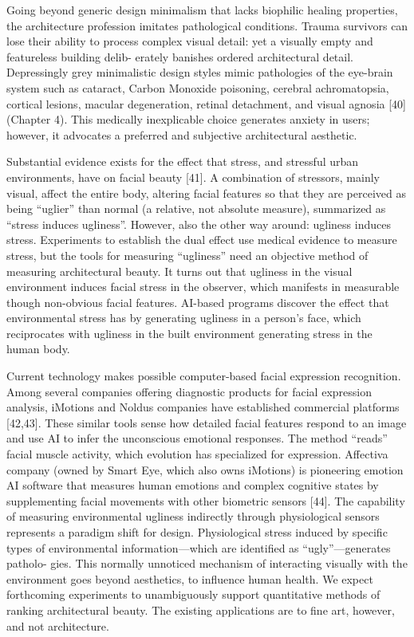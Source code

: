 \documentclass[a4paper]{article}
\begin{document}
Going beyond generic design minimalism that lacks biophilic healing properties, the
architecture profession imitates pathological conditions. Trauma survivors can lose their
ability to process complex visual detail: yet a visually empty and featureless building delib-
erately banishes ordered architectural detail. Depressingly grey minimalistic design styles
mimic pathologies of the eye-brain system such as cataract, Carbon Monoxide poisoning,
cerebral achromatopsia, cortical lesions, macular degeneration, retinal detachment, and
visual agnosia [40] (Chapter 4). This medically inexplicable choice generates anxiety in
users; however, it advocates a preferred and subjective architectural aesthetic.

Substantial evidence exists for the effect that stress, and stressful urban environments,
have on facial beauty [41]. A combination of stressors, mainly visual, affect the entire
body, altering facial features so that they are perceived as being “uglier” than normal (a
relative, not absolute measure), summarized as “stress induces ugliness”. However, also
the other way around: ugliness induces stress. Experiments to establish the dual effect
use medical evidence to measure stress, but the tools for measuring “ugliness” need an
objective method of measuring architectural beauty.
It turns out that ugliness in the visual environment induces facial stress in the observer,
which manifests in measurable though non-obvious facial features. AI-based programs discover the effect that environmental stress has by generating ugliness in a person’s
face, which reciprocates with ugliness in the built environment generating stress in the
human body.

Current technology makes possible computer-based facial expression recognition.
Among several companies offering diagnostic products for facial expression analysis,
iMotions and Noldus companies have established commercial platforms [42,43]. These
similar tools sense how detailed facial features respond to an image and use AI to infer
the unconscious emotional responses. The method “reads” facial muscle activity, which
evolution has specialized for expression. Affectiva company (owned by Smart Eye, which
also owns iMotions) is pioneering emotion AI software that measures human emotions
and complex cognitive states by supplementing facial movements with other biometric
sensors [44].
The capability of measuring environmental ugliness indirectly through physiological
sensors represents a paradigm shift for design. Physiological stress induced by specific
types of environmental information—which are identified as “ugly”—generates patholo-
gies. This normally unnoticed mechanism of interacting visually with the environment
goes beyond aesthetics, to influence human health. We expect forthcoming experiments to
unambiguously support quantitative methods of ranking architectural beauty. The existing
applications are to fine art, however, and not architecture.
\end{document}
